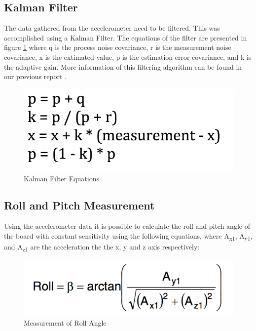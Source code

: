 \documentclass[12pt]{article}
\begin{document}
\subsection{Kalman Filter}
The data gathered from the accelerometer need to be filtered. This was accomplished using a Kalman Filter. The equations of the filter are presented in figure \ref{fig:kalman} where q is the process noise covariance, r is the measurement noise covariance, x is the extimated value, p is the estimation error covariance, and k is the adaptive gain. More information of this filtering algorithm can be found in our previous report \cite{Lab2report}.

\begin{figure}[!htb]
 \centering
 \includegraphics[scale=0.50]{images/kalman.png}
 \caption{Kalman Filter Equations}
 \label{fig:kalman}
\end{figure}

\subsection{Roll and Pitch Measurement}
Using the accelerometer data it is possible to calculate the roll and pitch angle of the board with constant sensitivity using the following equations, where A\textsubscript{x1}, A\textsubscript{y1}, and A\textsubscript{z1} are the acceleration the the x, y and z axis respectively:



\begin{figure}[!htb]
 \centering
 \includegraphics[scale=0.50]{images/roll.png}
 \caption{Measurement of Roll Angle}
 \label{fig:roll}
\end{figure}
\end{document}
